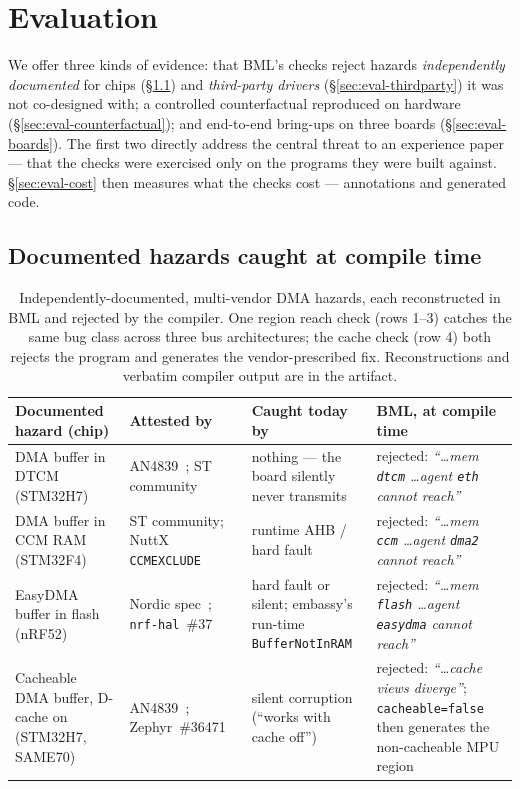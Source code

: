\documentclass[10pt,twocolumn]{article}
\begin{document}
\section{Evaluation}
\label{sec:eval}

We offer three kinds of evidence: that BML's checks reject hazards
\emph{independently documented} for chips (\S\ref{sec:eval-catalog}) and
\emph{third-party drivers} (\S\ref{sec:eval-thirdparty}) it was not co-designed
with; a controlled counterfactual reproduced on hardware
(\S\ref{sec:eval-counterfactual}); and end-to-end bring-ups on three boards
(\S\ref{sec:eval-boards}). The first two directly address the central threat to
an experience paper --- that the checks were exercised only on the programs they
were built against. \S\ref{sec:eval-cost} then measures what the checks cost ---
annotations and generated code.

\subsection{Documented hazards caught at compile time}
\label{sec:eval-catalog}

\begin{table}[t]
\centering\footnotesize
\renewcommand{\arraystretch}{1.25}
\begin{tabular}{@{}p{3.1cm}p{2.7cm}p{3.1cm}p{5.9cm}@{}}
\toprule
\textbf{Documented hazard (chip)} & \textbf{Attested by} & \textbf{Caught today by} & \textbf{BML, at compile time} \\
\midrule
DMA buffer in DTCM (STM32H7) & AN4839~\cite{an4839}; ST community & nothing --- the board silently never transmits & rejected: \emph{``\ldots mem \texttt{dtcm} \ldots agent \texttt{eth} cannot reach''} \\[6pt]
DMA buffer in CCM RAM (STM32F4) & ST community; NuttX \texttt{CCMEXCLUDE} & runtime AHB / hard fault & rejected: \emph{``\ldots mem \texttt{ccm} \ldots agent \texttt{dma2} cannot reach''} \\[6pt]
EasyDMA buffer in flash (nRF52) & Nordic spec~\cite{easydma}; \texttt{nrf-hal}~\#37 & hard fault or silent; embassy's run-time \texttt{BufferNotInRAM} & rejected: \emph{``\ldots mem \texttt{flash} \ldots agent \texttt{easydma} cannot reach''} \\[6pt]
Cacheable DMA buffer, D-cache on (STM32H7, SAME70) & AN4839~\cite{an4839}; Zephyr~\#36471~\cite{zephyrdma} & silent corruption (``works with cache off'') & rejected: \emph{``\ldots cache views diverge''}; \texttt{cacheable=false} then generates the non-cacheable MPU region \\
\bottomrule
\end{tabular}
\caption{Independently-documented, multi-vendor DMA hazards, each reconstructed
in BML and rejected by the compiler. One region reach check (rows 1--3) catches
the same bug class across three bus architectures; the cache check (row 4) both
rejects the program and generates the vendor-prescribed fix. Reconstructions and
verbatim compiler output are in the artifact.}
\label{tab:hazards}
\end{table}
\end{document}
